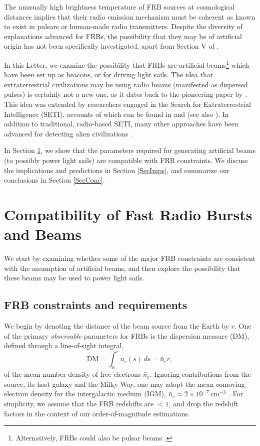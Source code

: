 \documentclass[twocolumn,tighten]{aastex61}
\begin{document}
The unusually high brightness temperature of FRB sources at cosmological distances \citep{Katz16} implies that their radio emission mechanism must be coherent as known to exist in pulsars or human-made radio transmitters. Despite the diversity of explanations advanced for FRBs, the possibility that they may be of artificial origin has not been specifically investigated, apart from Section V of \citet{LuGo16}.

In this Letter, we examine the possibility that FRBs are artificial beams\footnote{Alternatively, FRBs could also be pulsar beams \citep{JKatz16}.} which have been set up as beacons, or for driving light sails. The idea that extraterrestrial civilizations may be using radio beams (manifested as dispersed pulses) is certainly not a new one, as it dates back to the pioneering paper by \citet{CM59}. This idea was extended by researchers engaged in the Search for Extraterrestrial Intelligence (SETI), accounts of which can be found in \citet{DS92} and \citet{Tart01} (see also \citealt{Sie12}). In addition to traditional, radio-based SETI, many other approaches have been advanced for detecting alien civilizations \citep[e.g][]{Dys60,ST61,Het04,BBB10,Wet14,LL17}.

In Section \ref{SecConstraints}, we show that the parameters required for generating artificial beams (to possibly power light sails) are compatible with FRB constraints. We discuss the implications and predictions in Section \ref{SecImps}, and summarize our conclusions in Section \ref{SecConc}.

\section{Compatibility of Fast Radio Bursts and Beams}\label{SecConstraints}
We start by examining whether some of the major FRB constraints are consistent with the assumption of artificial beams, and then explore the possibility that these beams may be used to power light sails.

\subsection{FRB constraints and requirements} \label{SSecCons}
We begin by denoting the distance of the beam source from the Earth by $r$. One of the primary \emph{observable} parameters for FRBs is the dispersion measure (DM), defined through a line-of-sight integral,
\begin{equation} \label{DMexp}
    \mathrm{DM} = \int_0^r n_e(s)\,ds = \bar{n}_e r,
\end{equation}
of the mean number density of free electrons $\bar{n}_e$. Ignoring contributions from the source, its host galaxy and the Milky Way, one may adopt the mean comoving electron density for the intergalactic medium (IGM), $\bar{n}_e \approx 2 \times 10^{-7}\,\mathrm{cm}^{-3}$ \citep{Planck16,FL16}. For simplicity, we assume that the FRB redshifts are $<1$, and drop the redshift factors in the context of our order-of-magnitude estimations. 
\end{document}
